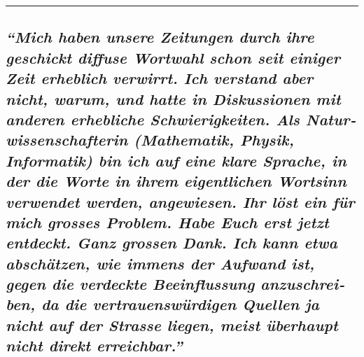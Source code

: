 \begin{center}\rule{0.5\linewidth}{\linethickness}\end{center}

\hypertarget{mich-haben-unsere-zeitungen-durch-ihre-geschickt-diffuse-wortwahl-schon-seit-einiger-zeit-erheblich-verwirrt-ich-verstand-aber-nicht-warum-und-hatte-in-diskussionen-mit-anderen-erhebliche-schwierigkeiten-als-naturwissenschafterin-mathematik-physik-informatik-bin-ich-auf-eine-klare-sprache-in-der-die-worte-in-ihrem-eigentlichen-wortsinn-verwendet-werden-angewiesen-ihr-luxf6st-ein-fuxfcr-mich-grosses-problem-habe-euch-erst-jetzt-entdeckt-ganz-grossen-dank-ich-kann-etwa-abschuxe4tzen-wie-immens-der-aufwand-ist-gegen-die-verdeckte-beeinflussung-anzuschreiben-da-die-vertrauenswuxfcrdigen-quellen-ja-nicht-auf-der-strasse-liegen-meist-uxfcberhaupt-nicht-direkt-erreichbar}{%
\subsection{\texorpdfstring{\emph{``Mich haben unsere Zeitungen durch
ihre geschickt diffuse Wortwahl schon seit einiger Zeit erheblich
verwirrt. Ich verstand aber nicht, warum, und hatte in Diskussionen mit
anderen erhebliche Schwierig­keiten. Als Natur­wissen­schaf­terin
(Mathematik, Physik, Informatik) bin ich auf eine klare Sprache, in der
die Worte in ihrem eigentlichen Wort­sinn verwendet werden, angewiesen.
Ihr löst ein für mich grosses Problem. Habe Euch erst jetzt entdeckt.
Ganz grossen Dank. Ich kann etwa abschätzen, wie immens der Aufwand ist,
gegen die verdeckte Beeinflussung anzu­schrei­ben, da die
ver­trauens­würdigen Quellen ja nicht auf der Strasse liegen, meist
überhaupt nicht direkt
erreichbar.''}}{``Mich haben unsere Zeitungen durch ihre geschickt diffuse Wortwahl schon seit einiger Zeit erheblich verwirrt. Ich verstand aber nicht, warum, und hatte in Diskussionen mit anderen erhebliche Schwierig­keiten. Als Natur­wissen­schaf­terin (Mathematik, Physik, Informatik) bin ich auf eine klare Sprache, in der die Worte in ihrem eigentlichen Wort­sinn verwendet werden, angewiesen. Ihr löst ein für mich grosses Problem. Habe Euch erst jetzt entdeckt. Ganz grossen Dank. Ich kann etwa abschätzen, wie immens der Aufwand ist, gegen die verdeckte Beeinflussung anzu­schrei­ben, da die ver­trauens­würdigen Quellen ja nicht auf der Strasse liegen, meist überhaupt nicht direkt erreichbar.''}}\label{mich-haben-unsere-zeitungen-durch-ihre-geschickt-diffuse-wortwahl-schon-seit-einiger-zeit-erheblich-verwirrt-ich-verstand-aber-nicht-warum-und-hatte-in-diskussionen-mit-anderen-erhebliche-schwierigkeiten-als-naturwissenschafterin-mathematik-physik-informatik-bin-ich-auf-eine-klare-sprache-in-der-die-worte-in-ihrem-eigentlichen-wortsinn-verwendet-werden-angewiesen-ihr-luxf6st-ein-fuxfcr-mich-grosses-problem-habe-euch-erst-jetzt-entdeckt-ganz-grossen-dank-ich-kann-etwa-abschuxe4tzen-wie-immens-der-aufwand-ist-gegen-die-verdeckte-beeinflussung-anzuschreiben-da-die-vertrauenswuxfcrdigen-quellen-ja-nicht-auf-der-strasse-liegen-meist-uxfcberhaupt-nicht-direkt-erreichbar}}

